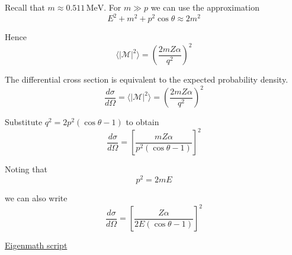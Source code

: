 Recall that $m\approx0.511\,\text{MeV}$.
For $m\gg p$ we can use the approximation
\begin{equation*}
E^2+m^2+p^2\cos\theta\approx2m^2
\end{equation*}

Hence
\begin{equation*}
\langle|\mathcal{M}|^2\rangle=\left(\frac{2mZ\alpha}{q^2}\right)^2
\end{equation*}

The differential cross section is equivalent to the expected probability density.
\begin{equation*}
\frac{d\sigma}{d\Omega}=\langle|\mathcal{M}|^2\rangle=\left(\frac{2mZ\alpha}{q^2}\right)^2
\end{equation*}

Substitute $q^2=2p^2(\cos\theta-1)$ to obtain
\begin{equation*}
\frac{d\sigma}{d\Omega}=\left[\frac{mZ\alpha}{p^2(\cos\theta-1)}\right]^2
\end{equation*}

Noting that
\begin{equation*}
p^2=2mE
\end{equation*}

we can also write
\begin{equation*}
\frac{d\sigma}{d\Omega}=\left[\frac{Z\alpha}{2E(\cos\theta-1)}\right]^2
\end{equation*}

\href{https://georgeweigt.github.io/examples/rutherford-scattering-3-demo.html}{Eigenmath script}


